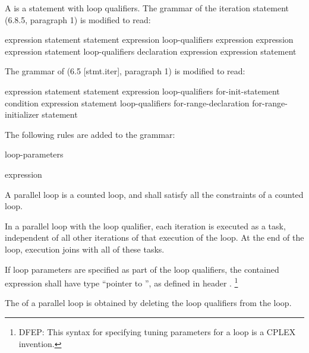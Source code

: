 
\pnum
A
is a
statement with loop qualifiers.
The grammar of the iteration statement (6.8.5, paragraph 1)
is modified to read:

\begin{bnf}
\br
{} \terminal{(} expression \terminal{)} statement
\br
{} statement  \terminal{(} expression \terminal{)} \terminal{;}
\br
loop-qualifiers\opt{}  \terminal{(}
expression\opt{} \terminal{;}
expression\opt{} \terminal{;}
expression\opt{} \terminal{)} statement
\br
loop-qualifiers\opt{}  \terminal{(}
declaration
expression\opt{} \terminal{;}
expression\opt{} \terminal{)} statement
\end{bnf}

\begin{cpp}
The grammar of
(6.5 [stmt.iter], paragraph 1)
is modified to read:

\begin{bnf}
\br
{} \terminal{(} expression \terminal{)} statement
\br
{} statement  \terminal{(} expression \terminal{)} \terminal{;}
\br
loop-qualifiers\opt{}  \terminal{(}
for-init-statement
condition\opt{} \terminal{;}
expression\opt{} \terminal{)} statement
\br
loop-qualifiers\opt{}  \terminal{(}
for-range-declaration \terminal{:}
for-range-initializer \terminal{)} statement
\end{bnf}

\end{cpp}

\pnum
The following rules are added to the grammar:

\begin{bnf}
\br
{} loop-parameters\opt
\end{bnf}

\begin{bnf}
\br
\terminal{[} expression \terminal{]}
\end{bnf}

\pnum
A parallel loop is a counted loop,
and shall satisfy all the constraints of a counted loop.

\pnum
In a parallel loop with the
loop qualifier,
each iteration is
executed as a task, independent of
all other iterations of that execution of the loop.
At the end of the loop,
execution joins with all of these tasks.

\pnum
If loop parameters are specified as part of the loop qualifiers,
the contained expression shall have type
``pointer to '',
as defined in header
.%
\footnote{DFEP:
This syntax for specifying tuning parameters for a loop
is a CPLEX invention.
}

\pnum
The
of a parallel loop
is obtained by deleting the loop qualifiers from the loop.